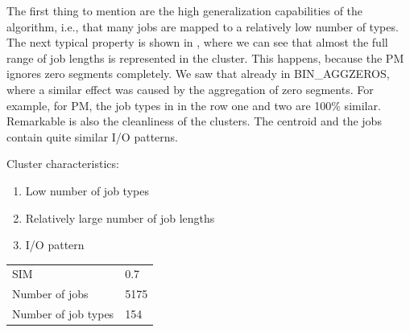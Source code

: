 \documentclass[]{llncs}
\begin{document}
The first thing to mention are the high generalization capabilities of the algorithm, i.e., that many jobs are mapped to a relatively low number of types.
The next typical property is shown in , where we can see that almost the full range of job lengths is represented in the cluster.
This happens, because the PM ignores zero segments completely.
We saw that already in BIN\_AGGZEROS, where a similar effect was caused by the aggregation of zero segments.
For example, for PM, the job types in  in the row one and two are 100$\%$  similar.
Remarkable is also the cleanliness of the clusters.
The centroid and the jobs contain quite similar I/O patterns.

Cluster characteristics:

\begin{enumerate}
 \item Low number of job types
 \item Relatively large number of job lengths
 \item I/O pattern 
\end{enumerate}

\begingroup
  \centering
  \begin{tabular}{ll}
    SIM & 0.7 \\
    Number of jobs & 5175 \\
    Number of job types & 154 \\
  \end{tabular}
  \label{fig:pm_quant:stats}
\endgroup
\end{document}
